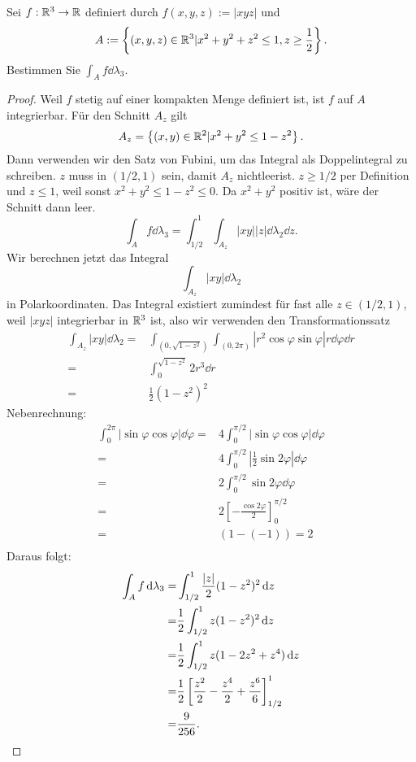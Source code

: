 \begin{Problem}
	Sei $f:\mathbb{R}^3\to \mathbb{R}$ definiert durch $f(x,y,z):=|xyz|$ und
	\[
		A:=\left\{ (x,y,z)\in \mathbb{R}^3|x^2+y^2+z^2\le 1, z\ge \frac{1}{2} \right\} 
	.\] 
	Bestimmen Sie $\int_A f\dd{\lambda_3}$.
\end{Problem}
\begin{proof}
	Weil $f$ stetig auf einer kompakten Menge definiert ist, ist $f$ auf $A$ integrierbar. F\"{u}r den Schnitt $A_z$ gilt
	\[
	A_z=\left\{ (x,y)\in \mathbb{R}^2|x^2+y^2\le 1 - z^2 \right\} 
	.\] 
	Dann verwenden wir den Satz von Fubini, um das Integral als Doppelintegral zu schreiben. $z$ muss in $(1 / 2, 1)$ sein, damit $A_z$ nichtleerist. $z\ge 1 / 2$ per Definition und $z\le 1$, weil sonst $x^2+y^2\le 1 - z^2\le 0$. Da $x^2+y^2$ positiv ist, wäre der Schnitt dann leer.
	\[
		\int_A f\dd{\lambda_3}=\int_{1 / 2}^1\int_{A_z}|xy| |z|\dd{\lambda_2}\dd{z}
	.\] 
	Wir berechnen jetzt das Integral
	\[
		\int_{A_z}|xy|\dd{\lambda_2}
	\]
	in Polarkoordinaten. Das Integral existiert zumindest f\"{u}r fast alle $z\in (1 / 2, 1)$, weil $|xyz|$ integrierbar in $\mathbb{R}^3$ ist, also wir verwenden den Transformationssatz
	\begin{align*}
		\int_{A_z}|x y|\dd{\lambda_2}=&\int_{(0,\sqrt{1-z^2} )}\int_{(0,2\pi)} |r^2\cos\varphi\sin\varphi|r\dd{\varphi}\dd{r}\\
		=&\int_0^{\sqrt{1-z^2} } 2r^3\dd{r}\\
		=&\frac{1}{2}(1-z^2)^2
	\end{align*}
	Nebenrechnung:
	\begin{align*}
		\int_0^{2\pi} |\sin\varphi\cos\varphi|\dd{\varphi}=&4\int_0^{\pi / 2}|\sin\varphi\cos\varphi|\dd{\varphi}\\
		=&4\int_0^{\pi /2}\left| \frac{1}{2}\sin 2\varphi \right| \dd{\varphi}\\
		=&2\int_0^{\pi / 2}\sin 2\varphi\dd{\varphi}\\
		=&2\left[ -\frac{\cos 2\varphi}{2} \right]_0^{\pi / 2}\\
		=&(1 - (-1))=2\\
	\end{align*}
	Daraus folgt:
	\begin{align*}
		\int_A f\dd{\lambda_3}=&\int_{1 / 2}^1 \frac{|z|}{2}(1-z^2)^2\dd{z}\\
		=&\frac{1}{2}\int_{1 / 2}^1 z(1-z^2)^2\dd{z}\\
		=&\frac{1}{2}\int_{1 / 2}^1 z(1-2z^2+z^4)\dd{z}\\
		=&\frac{1}{2}\left[ \frac{z^2}{2}-\frac{z^4}{2}+\frac{z^6}{6} \right]_{1 / 2}^1\\
		=&\frac{9}{256}.\qedhere
	\end{align*}
\end{proof}
